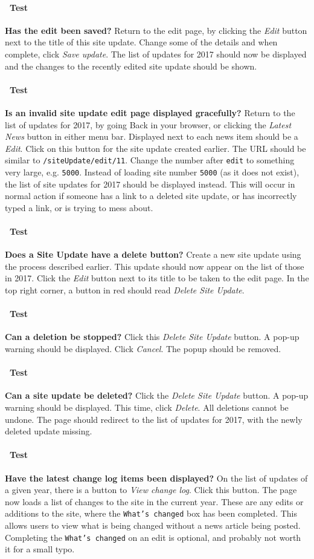 \documentclass[12pt]{article}
\newcounter{Test}
\newcommand{\test}[1]{%
\stepcounter{Test}%
\paragraph{\Circle\ Test \theTest} \textbf{#1} }
\begin{document}
\test{Has the edit been saved?}
Return to the edit page, by clicking the \textit{Edit} button next to the title of this site update. Change some of the details and when complete, click \textit{Save update}. The list of updates for 2017 should now be displayed and the changes to the recently edited site update should be shown.

\test{Is an invalid site update edit page displayed gracefully?}
Return to the list of updates for 2017, by going Back in your browser, or clicking the \textit{Latest News} button in either menu bar. Displayed next to each news item should be a \textit{Edit}. Click on this button for the site update created earlier. The URL should be similar to \texttt{/siteUpdate/edit/11}. Change the number after \texttt{edit} to something very large, e.g. \texttt{5000}. Instead of loading site number \texttt{5000} (as it does not exist), the list of site updates for 2017 should be displayed instead. This will occur in normal action if someone has a link to a deleted site update, or has incorrectly typed a link, or is trying to mess about.

\test{Does a Site Update have a delete button?}
Create a new site update using the process described earlier. This update should now appear on the list of those in 2017. Click the \textit{Edit} button next to its title to be taken to the edit page. In the top right corner, a button in red should read \textit{Delete Site Update}.

\test{Can a deletion be stopped?}
Click this \textit{Delete Site Update} button. A pop-up warning should be displayed. Click \textit{Cancel}. The popup should be removed.

\test{Can a site update be deleted?}
Click the \textit{Delete Site Update} button. A pop-up warning should be displayed. This time, click \textit{Delete}. All deletions cannot be undone. The page should redirect to the list of updates for 2017, with the newly deleted update missing.

\test{Have the latest change log items been displayed?}
On the list of updates of a given year, there is a button to \textit{View change log}. Click this button. The page now loads a list of changes to the site in the current year. These are any edits or additions to the site, where the \texttt{What's changed} box has been completed. This allows users to view what is being changed without a news article being posted. Completing the \texttt{What's changed} on an edit is optional, and probably not worth it for a small typo.
\end{document}
